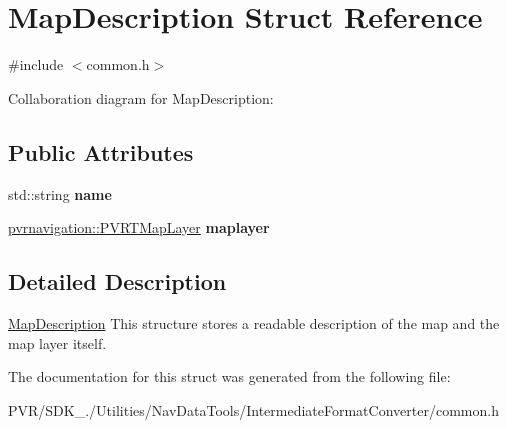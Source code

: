 \hypertarget{struct_map_description}{\section{Map\+Description Struct Reference}
\label{struct_map_description}
}


{\ttfamily \#include $<$common.\+h$>$}



Collaboration diagram for Map\+Description\+:
\subsection*{Public Attributes}
\begin{DoxyCompactItemize}
\item 
\hypertarget{struct_map_description_a667d7d1466be26862085acbfbb61b56b}{std\+::string {\bfseries name}}\label{struct_map_description_a667d7d1466be26862085acbfbb61b56b}

\item 
\hypertarget{struct_map_description_a7bcbf25f45545b6afb45d2810bb86afd}{\hyperlink{structpvrnavigation_1_1_p_v_r_t_map_layer}{pvrnavigation\+::\+P\+V\+R\+T\+Map\+Layer} {\bfseries maplayer}}\label{struct_map_description_a7bcbf25f45545b6afb45d2810bb86afd}

\end{DoxyCompactItemize}


\subsection{Detailed Description}


  \hyperlink{struct_map_description}{Map\+Description}  This structure stores a readable description of the map and the map layer itself. 

The documentation for this struct was generated from the following file\+:\begin{DoxyCompactItemize}
\item 
P\+V\+R/\+S\+D\+K\+\_./\+Utilities/\+Nav\+Data\+Tools/\+Intermediate\+Format\+Converter/common.\+h\end{DoxyCompactItemize}
